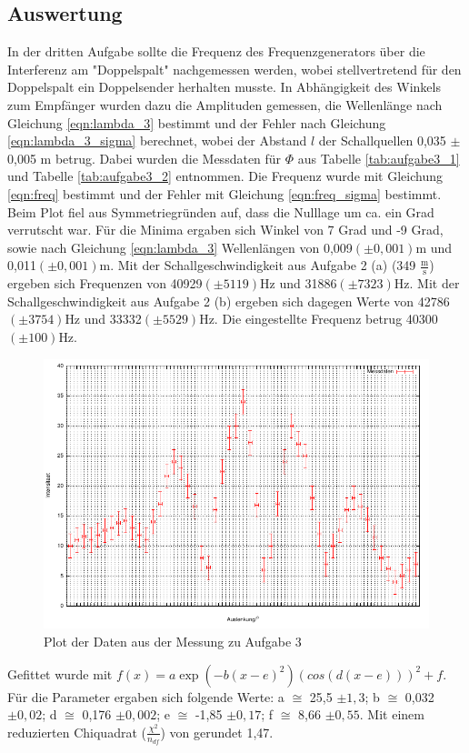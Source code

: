 \documentclass[12pt]{scrartcl}
\begin{document}
\subsection{Auswertung}
In der dritten Aufgabe sollte die Frequenz des Frequenzgenerators über die Interferenz am "Doppelspalt" nachgemessen werden, wobei stellvertretend für den Doppelspalt ein Doppelsender herhalten musste. In Abhängigkeit des Winkels zum Empfänger wurden dazu die Amplituden gemessen, die Wellenlänge nach Gleichung \ref{eqn:lambda_3} bestimmt und der Fehler nach Gleichung \ref{eqn:lambda_3_sigma} berechnet, wobei der Abstand $l$ der Schallquellen 0,035 $\pm$ 0,005 m betrug. Dabei wurden die Messdaten für $\Phi$ aus Tabelle \ref{tab:aufgabe3_1} und Tabelle \ref{tab:aufgabe3_2} entnommen. Die Frequenz wurde mit Gleichung \ref{eqn:freq} bestimmt und der Fehler mit Gleichung \ref{eqn:freq_sigma} bestimmt. Beim Plot fiel aus Symmetriegründen auf, dass die Nulllage um ca. ein Grad verrutscht war. Für die Minima ergaben sich Winkel von 7 Grad und -9 Grad, sowie nach Gleichung \ref{eqn:lambda_3} Wellenlängen von 0,009$(\pm 0,001)$m und 0,011$(\pm 0,001)$m. Mit der Schallgeschwindigkeit aus Aufgabe 2 (a) (349 $\frac{\text{m}}{\text{s}}$) ergeben sich Frequenzen von 40929$(\pm 5119)$Hz und 31886$(\pm 7323)$Hz. Mit der Schallgeschwindigkeit aus Aufgabe 2 (b) ergeben sich dagegen Werte von 42786$(\pm 3754)$Hz und 33332$(\pm 5529)$Hz. Die eingestellte Frequenz betrug 40300$(\pm100)$Hz.
\begin{figure}[H] 
  \centering
    \includegraphics[scale=1.2]{aufgabe_3.pdf}
  	\caption[Plot der Daten aus der Messung zu Aufgabe 3]{Plot der Daten aus der Messung zu Aufgabe 3}
  \label{fig:plot}
\end{figure}
Gefittet wurde mit $f(x) = a\exp(-b(x-e)^2)(cos(d(x-e)))^2+f$.
Für die Parameter ergaben sich folgende Werte: a $\cong$ 25,5 $\pm 1,3$; b $\cong$ 0,032 $\pm 0,02$; d $\cong$ 0,176 $\pm 0,002$; e $\cong$ -1,85 $\pm 0,17$; f $\cong$ 8,66 $\pm 0,55$.
Mit einem reduzierten Chiquadrat ($\frac{\chi^2}{n_{df}}$) von gerundet 1,47.
\end{document}
